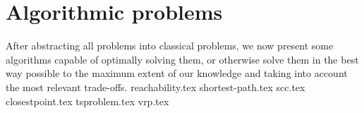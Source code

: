 \chapter{Algorithmic problems} \label{algorithm}
After abstracting all problems into classical problems, we now present some algorithms capable of optimally solving them, or otherwise solve them in the best way possible to the maximum extent of our knowledge and taking into account the most relevant trade-offs.
{reachability.tex}
{shortest-path.tex}
{scc.tex}
{closestpoint.tex}
{tsproblem.tex}
{vrp.tex}
